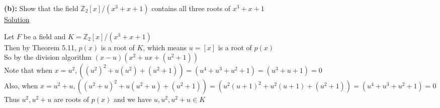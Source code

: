 \documentclass{article} %
\begin{document}
\textbf{(b):} Show that the field $\mathbb{Z}_2[x]/(x^3 + x + 1)$ contains all three roots of $x^3 + x + 1$
\\

\underline{Solution}
\begin{addmargin}[1em]{0em}
Let $F$ be a field and $K = \mathbb{Z}_2[x]/(x^3 + x + 1)$
\\Then by Theorem 5.11, $p(x)$ is a root of $K$, which means $u=[x]$ is a root of $p(x)$
\\So by the division algorithm $(x-u)(x^2 + ux + (u^2 + 1))$
\\Note that when $x = u^2, ((u^2)^2 + u(u^2) + (u^2 + 1)) = (u^4 + u^3 + u^2 + 1) = (u^3 + u + 1) = 0$
\\Also, when $x = u^2 + u, ((u^2 + u)^2 + u(u^2 + u) + (u^2 + 1)) = (u^2(u+1)^2 + u^2(u+1)+(u^2 + 1)) = (u^4 + u^3 + u^2 + 1) = 0$
\\Thus $u^2, u^2 + u$ are roots of $p(x)$ and we have $u, u^2, u^2 + u \in K$
\end{addmargin}

\end{document}

